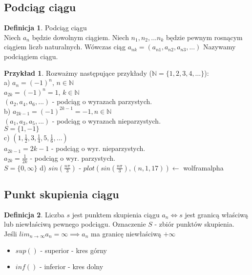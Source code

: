 \documentclass{article}
\theoremstyle{definition}
\newtheorem{de}{Definicja}[subsection]
\theoremstyle{definition}
\theoremstyle{definition}
\newtheorem{pk}{Przykład}[subsection]
\theoremstyle{definition}
\begin{document}
\subsection{Podciąg ciągu}

\begin{de}
Podciąg ciągu\\
Niech $a_n$ będzie dowolnym ciągiem. Niech $n_1, n_2, ... n_k$ będzie pewnym rosnącym ciągiem liczb naturalnych.
Wówczas ciąg $a_{nk}=(a_{n1}, a_{n2}, a_{n3}, ...)$ Nazywamy podciągiem ciągu.
\end{de}

\begin{pk}
Rozważmy następujące przykłady ($\mathbb{N}=\{1,2,3,4,\dots\}$):\\
a) $a_n=(-1)^{n}$, $n\in\mathbb{N}$\\
$a_{2k}=(-1)^{n}=1$, $k\in\mathbb{N}$\\
$(a_2, a_4, a_6, ...)$ - podciąg o wyrazach parzystych.\\
b) $a_{2k-1}=(-1)^{2k-1}=-1, n\in\mathbb{N}$\\
$(a_1, a_3, a_5, ...)$ - podciąg o wyrazach nieparzystych.\\
$S=\{1,-1\}$\\
c) $(1, \frac{1}{2}, 3, \frac{1}{4}, 5, \frac{1}{6},\dots)$\\
$a_{2k-1}=2k-1$ - podciąg o wyr. nieparzystych.\\
$a_{2k}=\frac{1}{2k}$ - podciąg o wyr. parzystych.\\
$S=\{0, \infty\}$
d) $sin(\frac{n\pi}{3})$ - $plot(sin(\frac{n\pi}{3}),(n,1,17)) \leftarrow$ wolframalpha
\end{pk}

\subsection{Punkt skupienia ciągu}

\begin{de}
Liczba $s$ jest punktem skupienia ciągu $a_n\iff s$ jest granicą właściwą lub niewłaściwą pewnego podciągu.
Oznaczenie $S$ - zbiór punktów skupienia.\\

Jeśli $lim_{n\rightarrow \infty} a_n = \infty \implies a_n$ ma granicę niewłaściwą $+\infty$
\end{de}

\begin{itemize}
\item $sup()$ - superior - kres górny
\item $inf()$ - inferior - kres dolny
\end{itemize}
\end{document}
